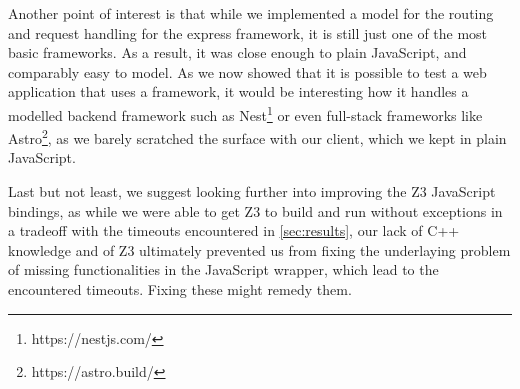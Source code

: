 Another point of interest is that while we implemented a model for the routing and request handling for the express framework, it is still just one of the most basic frameworks. As a result, it was close enough to plain JavaScript, and comparably easy to model. As we now showed that it is possible to test a web application that uses a framework, it would be interesting how it handles a modelled backend framework such as Nest\footnote{https://nestjs.com/} or even full-stack frameworks like Astro\footnote{https://astro.build/}, as we barely scratched the surface with our client, which we kept in plain JavaScript.

Last but not least, we suggest looking further into improving the Z3 JavaScript bindings, as while we were able to get Z3 to build and run without exceptions in a tradeoff with the timeouts encountered in \autoref{sec:results}, our lack of C++ knowledge and of Z3 ultimately prevented us from fixing the underlaying problem of missing functionalities in the JavaScript wrapper, which lead to the encountered timeouts. Fixing these might remedy them.






